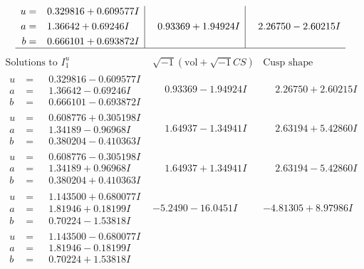 \documentclass[1p]{elsarticle_modified}
\theoremstyle{definition}
\newcommand{\I}{\sqrt{-1}}
\begin{document}
$$\begin{array}{c|c|c}
\begin{aligned}
u &= \phantom{-}0.329816 + 0.609577 I \\
a &= \phantom{-}1.36642 + 0.69246 I \\
b &= \phantom{-}0.666101 + 0.693872 I\end{aligned}
 & \phantom{-}0.93369 + 1.94924 I & \phantom{-}2.26750 - 2.60215 I\\
 \hline 
 \end{array}$$\newpage$$\begin{array}{c|c|c}  
\text{Solutions to }I^u_{1}& \I (\text{vol} + \sqrt{-1}CS) & \text{Cusp shape}\\
 \hline 
\begin{aligned}
u &= \phantom{-}0.329816 - 0.609577 I \\
a &= \phantom{-}1.36642 - 0.69246 I \\
b &= \phantom{-}0.666101 - 0.693872 I\end{aligned}
 & \phantom{-}0.93369 - 1.94924 I & \phantom{-}2.26750 + 2.60215 I \\ \hline\begin{aligned}
u &= \phantom{-}0.608776 + 0.305198 I \\
a &= \phantom{-}1.34189 - 0.96968 I \\
b &= \phantom{-}0.380204 - 0.410363 I\end{aligned}
 & \phantom{-}1.64937 - 1.34941 I & \phantom{-}2.63194 + 5.42860 I \\ \hline\begin{aligned}
u &= \phantom{-}0.608776 - 0.305198 I \\
a &= \phantom{-}1.34189 + 0.96968 I \\
b &= \phantom{-}0.380204 + 0.410363 I\end{aligned}
 & \phantom{-}1.64937 + 1.34941 I & \phantom{-}2.63194 - 5.42860 I \\ \hline\begin{aligned}
u &= \phantom{-}1.143500 + 0.680077 I \\
a &= \phantom{-}1.81946 + 0.18199 I \\
b &= \phantom{-}0.70224 - 1.53818 I\end{aligned}
 & -5.2490 - 16.0451 I & -4.81305 + 8.97986 I \\ \hline\begin{aligned}
u &= \phantom{-}1.143500 - 0.680077 I \\
a &= \phantom{-}1.81946 - 0.18199 I \\
b &= \phantom{-}0.70224 + 1.53818 I\end{aligned}

\end{array}$$
\end{document}
